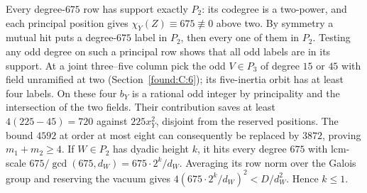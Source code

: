 \documentclass[11pt,a4paper]{article}
\numberwithin{equation}{section}
\theoremstyle{remark}
\begin{document}
Every degree-$675$ row has support exactly $P_2$: its codegree is a two-power, and each principal position gives $\chi_Y(Z)\equiv675\not\equiv0$ above two. By symmetry a mutual hit puts a degree-$675$ label in $P_2$, then every one of them in $P_2$. Testing any odd degree on such a principal row shows that all odd labels are in its support. At a joint three--five column pick the odd $V\in P_3$ of degree $15$ or $45$ with field unramified at two (Section~\ref{found:C:6}); its five-inertia orbit has at least four labels. On these four $b_Y$ is a rational odd integer by principality and the intersection of the two fields. Their contribution saves at least $4(225-45)=720$ against $225x_Y^2$, disjoint from the reserved positions. The bound $4592$ at order at most eight can consequently be replaced by $3872$, proving $m_1+m_2\ge4$. If $W\in P_2$ has dyadic height $k$, it hits every degree $675$ with lcm-scale $675/\gcd(675,d_W)=675\cdot 2^k/d_W$. Averaging its row norm over the Galois group and reserving the vacuum gives $4(675\cdot2^k/d_W)^2<D/d_W^2$. Hence $k\le1$.
\end{document}
